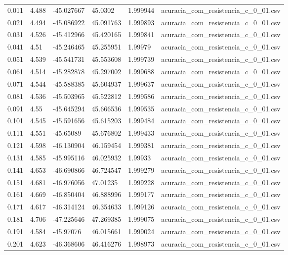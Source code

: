 \begin{table}
\begin{tabular}{llllll}
0.011 & 4.488 & -45.027667 & 45.0302 & 1.999944 & acuracia\_com\_resistencia\_c\_0\_01.csv \\
0.021 & 4.494 & -45.086922 & 45.091763 & 1.999893 & acuracia\_com\_resistencia\_c\_0\_01.csv \\
0.031 & 4.526 & -45.412966 & 45.420165 & 1.999841 & acuracia\_com\_resistencia\_c\_0\_01.csv \\
0.041 & 4.51 & -45.246465 & 45.255951 & 1.99979 & acuracia\_com\_resistencia\_c\_0\_01.csv \\
0.051 & 4.539 & -45.541731 & 45.553608 & 1.999739 & acuracia\_com\_resistencia\_c\_0\_01.csv \\
0.061 & 4.514 & -45.282878 & 45.297002 & 1.999688 & acuracia\_com\_resistencia\_c\_0\_01.csv \\
0.071 & 4.544 & -45.588385 & 45.604937 & 1.999637 & acuracia\_com\_resistencia\_c\_0\_01.csv \\
0.081 & 4.536 & -45.503965 & 45.522812 & 1.999586 & acuracia\_com\_resistencia\_c\_0\_01.csv \\
0.091 & 4.55 & -45.645294 & 45.666536 & 1.999535 & acuracia\_com\_resistencia\_c\_0\_01.csv \\
0.101 & 4.545 & -45.591656 & 45.615203 & 1.999484 & acuracia\_com\_resistencia\_c\_0\_01.csv \\
0.111 & 4.551 & -45.65089 & 45.676802 & 1.999433 & acuracia\_com\_resistencia\_c\_0\_01.csv \\
0.121 & 4.598 & -46.130904 & 46.159454 & 1.999381 & acuracia\_com\_resistencia\_c\_0\_01.csv \\
0.131 & 4.585 & -45.995116 & 46.025932 & 1.99933 & acuracia\_com\_resistencia\_c\_0\_01.csv \\
0.141 & 4.653 & -46.690866 & 46.724547 & 1.999279 & acuracia\_com\_resistencia\_c\_0\_01.csv \\
0.151 & 4.681 & -46.976056 & 47.01235 & 1.999228 & acuracia\_com\_resistencia\_c\_0\_01.csv \\
0.161 & 4.669 & -46.850404 & 46.888996 & 1.999177 & acuracia\_com\_resistencia\_c\_0\_01.csv \\
0.171 & 4.617 & -46.314124 & 46.354633 & 1.999126 & acuracia\_com\_resistencia\_c\_0\_01.csv \\
0.181 & 4.706 & -47.225646 & 47.269385 & 1.999075 & acuracia\_com\_resistencia\_c\_0\_01.csv \\
0.191 & 4.584 & -45.97076 & 46.015661 & 1.999024 & acuracia\_com\_resistencia\_c\_0\_01.csv \\
0.201 & 4.623 & -46.368606 & 46.416276 & 1.998973 & acuracia\_com\_resistencia\_c\_0\_01.csv \\

\end{tabular}
\end{table}

